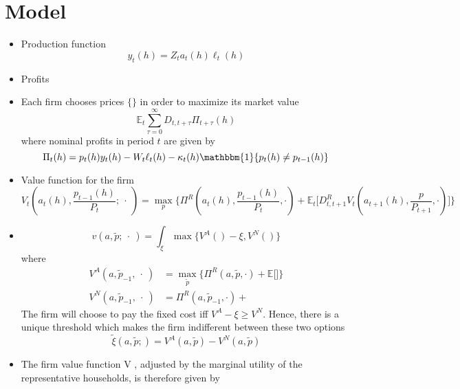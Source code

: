 \documentclass[a4paper,10pt]{article}  %
\begin{document}
\section{Model} %
\label{sec:model}
\begin{itemize}
   \item Production function
   \begin{equation}
      \label{eq:model_eq1}
      y_t(h) = Z_t a_t(h) \ell_t(h)
   \end{equation}

   \item Profits
   
   \item Each firm chooses prices $ \{\} $ in order to maximize its market value
   \begin{equation}
      \label{eq:model_eq}
      \mathbb{E}_t \sum_{\tau=0}^{\infty} D_{t,t+\tau} \Pi_{t+\tau} (h)
   \end{equation}
   where nominal profits in period $ t $ are given by
   \begin{equation}
      \label{eq:model_eq3}
      \Pi_t(h) = p_t(h) y_t(h) - W_t \ell_t(h) - \kappa_t(h) \mathbbm{1}\{p_t(h) \ne p_{t-1}(h)\}
   \end{equation}
   \item Value function for the firm
   \[
      V_t \left( a_t(h), \frac{ p_{t-1}(h) }{ P_t }; \ \cdot \ \right) = 
      \max_{p} 
      \bigg\{
         \Pi^R \left( a_t(h), \frac{ p_{t-1}(h) }{ P_t }, \cdot \right) + 
         \mathbb{E}_t \bigg[ D^R_{t,t+1} V_t \left( a_{t+1}(h), \frac{ p }{ P_{t+1} }, \cdot \right) \bigg]
      \bigg\}
   \]

   \item 
   \[
      v(a, \tilde{p}; \ \cdot \ ) = \int_{\xi} \max \Big\{ V^A(  ) - \xi , V^N( )  \Big\}
   \]
   where
   \begin{equation}
      \label{eq:model_eq4}
      \begin{split}
      V^A(a, \tilde{p}_{-1}, \ \cdot \ ) & = \max_{\tilde{p}} 
         \bigg\{ 
            \Pi^R \left( a, \tilde{p}, \cdot \right) + 
            \mathbb{E} \bigg[  \bigg]
         \bigg\} \\
      V^N(a, \tilde{p}_{-1}, \ \cdot \ ) & = 
          \Pi^R \left( a, \tilde{p}_{-1}, \cdot \right) + 
      \end{split}
   \end{equation}
   The firm will choose to pay the fixed cost iff $ V^A -\xi \ge V^N $. Hence,
   there is a unique threshold which makes the firm indifferent between these
   two options
   \[
      \tilde{\xi}(a, \tilde{p} ; ) = V^A(a, \tilde{p} ) - V^N( a, \tilde{p})
   \]
   \item The firm value function V , adjusted by the marginal utility of the representative households, is therefore given by
\end{itemize}
\end{document}
